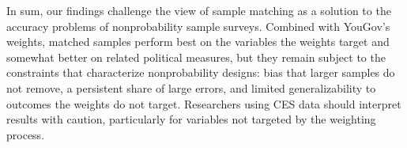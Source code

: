\documentclass[12pt]{article}
\begin{document}
In sum, our findings challenge the view of sample matching as a solution to the accuracy problems of nonprobability sample surveys. Combined with YouGov's weights, matched samples perform best on the variables the weights target and somewhat better on related political measures, but they remain subject to the constraints that characterize nonprobability designs: bias that larger samples do not remove, a persistent share of large errors, and limited generalizability to outcomes the weights do not target. Researchers using CES data should interpret results with caution, particularly for variables not targeted by the weighting process.



\end{document}
